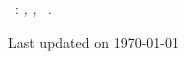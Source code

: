\clearpage
{}
\thispagestyle{empty}

\hfill
\vfill

\noindent\AuthorName\ \AuthorSurname: \textit{\Title,}
\DegreeName,
\textcopyright\ \CopyrightYear.
\noindent \par\hfill{\scriptsize\color{gray}Last updated on \today}
